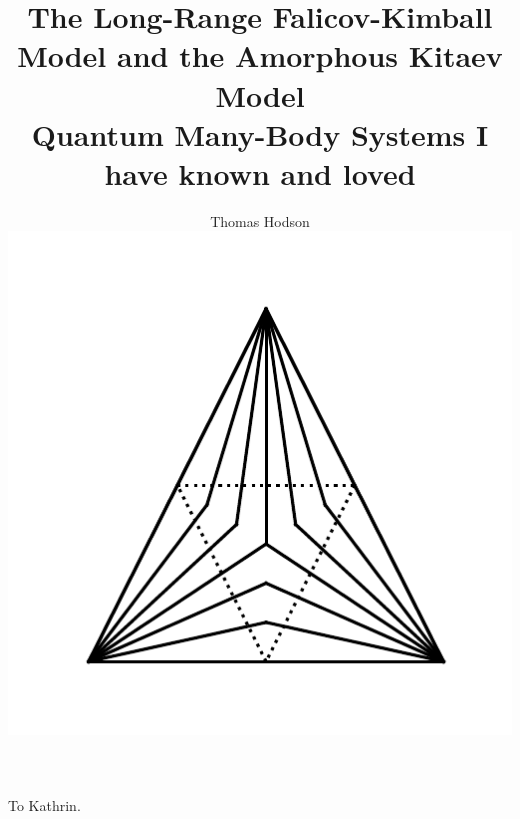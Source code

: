 \documentclass[a4paper,12pt]{report}
\begin{document}
\title{\LARGE {\bf The Long-Range Falicov-Kimball
Model and the Amorphous Kitaev Model \\
[0.2em]\smaller{}Quantum Many-Body Systems I have known and loved}\\
 \vspace*{6mm}
}

\author{Thomas Hodson\\\vspace{10mm}
\includegraphics[width=.4\textwidth,height=.4\textheight]{figure_code/logo/logo}
\vspace{-0.4\textheight}
\vspace{10mm}
}


\maketitle

\preface

\begin{abstract}

\end{abstract}



\cleardoublepage
{}
\begin{acknowledgements}

\end{acknowledgements}

\cleardoublepage
\vspace*{100mm} %
\begin{center}To Kathrin.\end{center}
\end{document}
